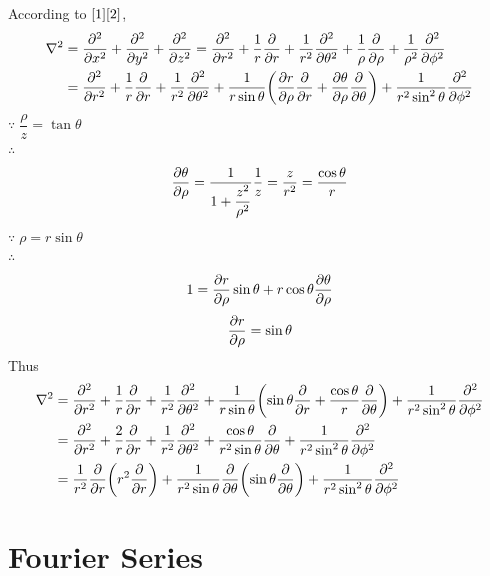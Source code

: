 \documentclass[UTF8]{ctexart} %
\numberwithin{equation}{section}
\begin{document}
According to $\eqref{1} \eqref{2}$,
\begin{equation}\label{key}
\begin{aligned}
\nabla^2 &=\pdv[2]{x}+\pdv[2]{y}+\pdv[2]{z}=\pdv[2]{r}+\dfrac{1}{r}\pdv{r}+\dfrac{1}{r^2}\pdv[2]{\theta}+\dfrac{1}{\rho}\pdv{\rho}+\dfrac{1}{\rho^2}\pdv[2]{\phi}\\
&=\pdv[2]{r}+\dfrac{1}{r}\pdv{r}+\dfrac{1}{r^2}\pdv[2]{\theta}+\dfrac{1}{r\sin\theta}\qty(\pdv{r}{\rho}\pdv{r}+\pdv{\theta}{\rho}\pdv{\theta})+\dfrac{1}{r^2 \sin^2\theta}\pdv[2]{\phi}
\end{aligned}
\end{equation}
$\because\; \dfrac{\rho}{z}=\tan\theta$\\
$\therefore$
\begin{equation}\label{key}
\pdv{\theta}{\rho}=\dfrac{1}{1+\dfrac{z^2}{\rho^2}}\dfrac{1}{z}=\dfrac{z}{r^2}=\dfrac{\cos\theta}{r}
\end{equation}
$\because\;\rho=r\sin\theta $\\
$\therefore$
\begin{equation}\label{key}
1=\pdv{r}{\rho}\sin\theta+r\cos\theta\pdv{\theta}{\rho}
\end{equation}
\begin{equation}\label{key}
\pdv{r}{\rho}=\sin\theta
\end{equation}
Thus
\begin{equation}\label{key}
\begin{aligned}
\nabla^2&=\pdv[2]{r}+\dfrac{1}{r}\pdv{r}+\dfrac{1}{r^2}\pdv[2]{\theta}+\dfrac{1}{r\sin\theta}\qty(\sin\theta\pdv{r}+\dfrac{\cos\theta}{r}\pdv{\theta})+\dfrac{1}{r^2 \sin^2\theta}\pdv[2]{\phi}\\
&=\pdv[2]{r}+\dfrac{2}{r}\pdv{r}+\dfrac{1}{r^2}\pdv[2]{\theta}+\dfrac{\cos\theta}{r^2\sin\theta}\pdv{\theta}+\dfrac{1}{r^2 \sin^2\theta}\pdv[2]{\phi}\\
&=\dfrac{1}{r^2}\pdv{r}\qty(r^2 \pdv{r})+\dfrac{1}{r^2 \sin{\theta}}\pdv{\theta}\qty(\sin\theta\pdv{\theta})+\dfrac{1}{r^2 \sin^2\theta}\pdv[2]{\phi}
\end{aligned}
\end{equation}


\section{Fourier Series}
\end{document}
